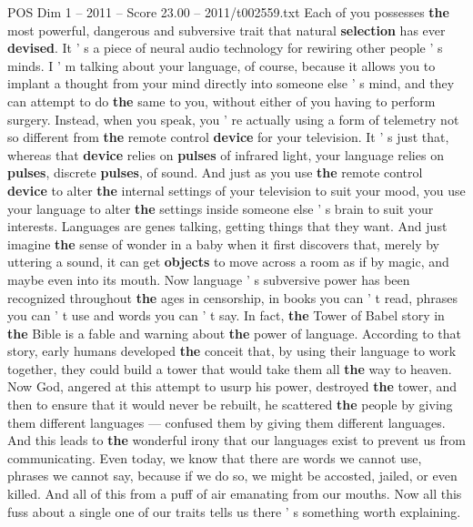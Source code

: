 \begin{textsample}{POS Dim 1 – 2011 – Score 23.00 – 2011/t002559.txt}  \label{ex:f1_pos_033}
Each of you possesses \textbf{the} most powerful, dangerous and subversive trait that natural \textbf{selection} has ever \textbf{devised}.
It ' s a piece of neural audio technology for rewiring other people ' s minds.
I ' m talking about your language, of course, because it allows you to implant a thought from your mind directly into someone else ' s mind, and they can attempt to do \textbf{the} same to you, without either of you having to perform surgery.
Instead, when you speak, you ' re actually using a form of telemetry not so different from \textbf{the} remote control \textbf{device} for your television.
It ' s just that, whereas that \textbf{device} relies on \textbf{pulses} of infrared light, your language relies on \textbf{pulses}, discrete \textbf{pulses}, of sound.
And just as you use \textbf{the} remote control \textbf{device} to alter \textbf{the} internal settings of your television to suit your mood, you use your language to alter \textbf{the} settings inside someone else ' s brain to suit your interests.
Languages are genes talking, getting things that they want.
And just imagine \textbf{the} sense of wonder in a baby when it first discovers that, merely by uttering a sound, it can get \textbf{objects} to move across a room as if by magic, and maybe even into its mouth.
Now language ' s subversive power has been recognized throughout \textbf{the} ages in censorship, in books you can ' t read, phrases you can ' t use and words you can ' t say.
In fact, \textbf{the} Tower of Babel story in \textbf{the} Bible is a fable and warning about \textbf{the} power of language.
According to that story, early humans developed \textbf{the} conceit that, by using their language to work together, they could build a tower that would take them all \textbf{the} way to heaven.
Now God, angered at this attempt to usurp his power, destroyed \textbf{the} tower, and then to ensure that it would never be rebuilt, he scattered \textbf{the} people by giving them different languages — confused them by giving them different languages.
And this leads to \textbf{the} wonderful irony that our languages exist to prevent us from communicating.
Even today, we know that there are words we cannot use, phrases we cannot say, because if we do so, we might be accosted, jailed, or even killed.
And all of this from a puff of air emanating from our mouths.
Now all this fuss about a single one of our traits tells us there ' s something worth explaining.

\end{textsample}
